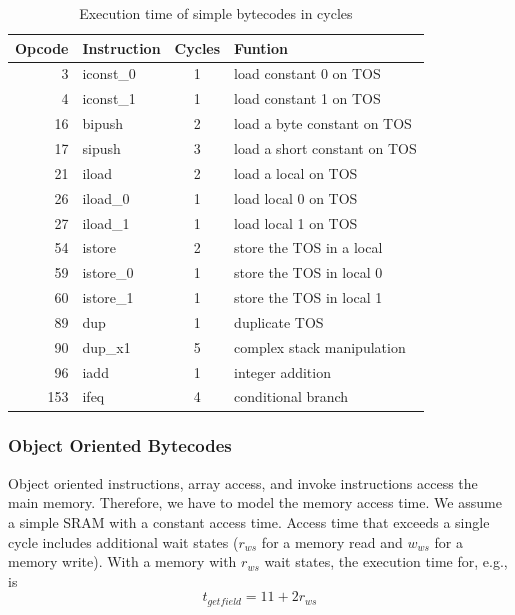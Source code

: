 \begin{table}
\centering
\begin{tabular}{rlcl}
    \toprule
    Opcode & Instruction & Cycles & Funtion\\
    \midrule
3 & iconst\_0  & 1 & load constant 0 on TOS\\
4 & iconst\_1  & 1 & load constant 1 on TOS\\
16 & bipush & 2 & load a byte constant on TOS\\
17 & sipush & 3 & load a short constant on TOS\\
21 & iload  & 2 & load a local on TOS\\
26 & iload\_0 & 1 & load local 0 on TOS\\
27 & iload\_1 & 1 & load local 1 on TOS\\
54 & istore  & 2 & store the TOS in a local\\
59 & istore\_0 & 1 & store the TOS in local 0\\
60 & istore\_1 & 1 & store the TOS in local 1\\
89 & dup & 1 & duplicate TOS\\
90 & dup\_x1 & 5 & complex stack manipulation\\
96 & iadd & 1 & integer addition\\
153 & ifeq & 4 & conditional branch\\
    \bottomrule
\end{tabular}
    \caption{Execution time of simple bytecodes in cycles}
    \label{tab:simple}
\end{table}


\subsubsection{Object Oriented Bytecodes}

Object oriented instructions, array access, and invoke instructions
access the main memory. Therefore, we have to model the memory access
time. We assume a simple SRAM with a constant access time. Access
time that exceeds a single cycle includes additional wait states
($r_{ws}$ for a memory read and $w_{ws}$ for a memory write). With a
memory with $r_{ws}$ wait states, the execution time for, e.g.,
 is
\begin{equation*}
    t_{\textit{getfield}} = 11 + 2 r_{ws}
\end{equation*}

